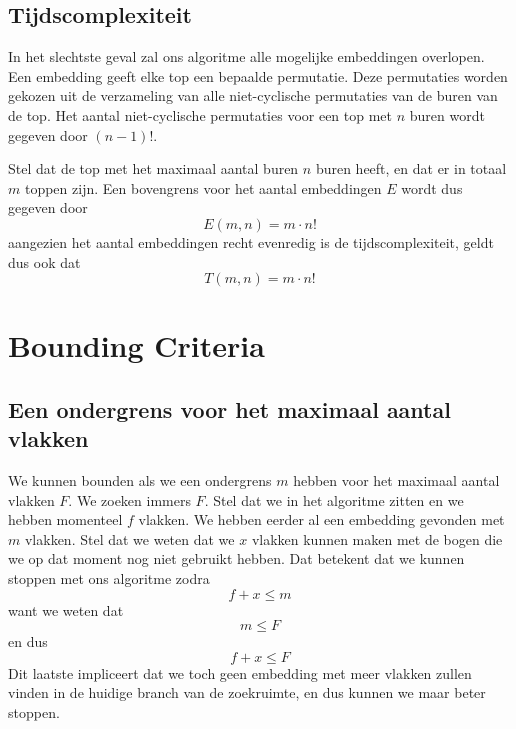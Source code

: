 \documentclass{article}
\begin{document}
\subsection{Tijdscomplexiteit}
In het slechtste geval zal ons algoritme alle mogelijke embeddingen overlopen.
Een embedding geeft elke top een bepaalde permutatie. Deze permutaties worden
gekozen uit de verzameling van alle niet-cyclische permutaties van de buren
van de top. Het aantal niet-cyclische permutaties voor een top met $n$ buren
wordt gegeven door $(n-1)!$.
\newline

Stel dat de top met het maximaal aantal buren $n$ buren heeft, en dat er in
totaal $m$ toppen zijn. Een bovengrens voor het aantal embeddingen $E$ wordt dus
gegeven door
\begin{equation*}
E(m, n) = m \cdot n !
\end{equation*}
aangezien het aantal embeddingen recht evenredig is de tijdscomplexiteit, geldt
dus ook dat
\begin{equation*}
T(m, n) = m \cdot n !
\end{equation*}

\section{Bounding Criteria}
\label{bounding-criteria}

\subsection{Een ondergrens voor het maximaal aantal vlakken}
\label{ondergrens-maximaal-aantal-vlakken}
We kunnen bounden als we een ondergrens $m$ hebben voor het maximaal aantal
vlakken $F$. We zoeken immers $F$. Stel dat we in het algoritme zitten en we
hebben momenteel $f$ vlakken. We hebben eerder al een embedding gevonden met
$m$ vlakken. Stel dat we weten dat we $x$ vlakken kunnen maken met de bogen die
we op dat moment nog niet gebruikt hebben. Dat betekent dat we kunnen stoppen
met ons algoritme zodra
\begin{equation*}
f + x \leq m
\end{equation*}
want we weten dat
\begin{equation*}
m \leq F
\end{equation*}
en dus
\begin{equation*}
f + x \leq F
\end{equation*}
Dit laatste impliceert dat we toch geen embedding met meer vlakken zullen vinden
in de huidige branch van de zoekruimte, en dus kunnen we maar beter stoppen.
\newline
\end{document}
